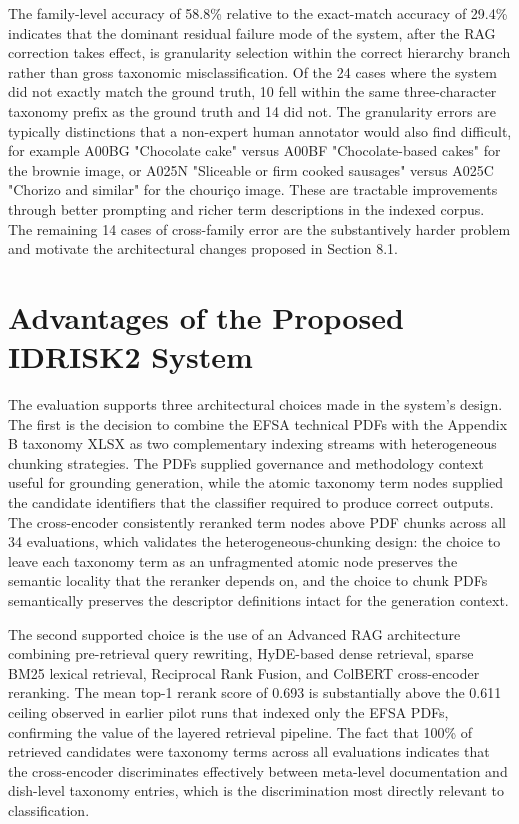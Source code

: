 The family-level accuracy of 58.8\% relative to the exact-match accuracy of 29.4\% indicates that the dominant residual failure mode of the system, after the RAG correction takes effect, is granularity selection within the correct hierarchy branch rather than gross taxonomic misclassification. Of the 24 cases where the system did not exactly match the ground truth, 10 fell within the same three-character taxonomy prefix as the ground truth and 14 did not. The granularity errors are typically distinctions that a non-expert human annotator would also find difficult, for example A00BG "Chocolate cake" versus A00BF "Chocolate-based cakes" for the brownie image, or A025N "Sliceable or firm cooked sausages" versus A025C "Chorizo and similar" for the chouriço image. These are tractable improvements through better prompting and richer term descriptions in the indexed corpus. The remaining 14 cases of cross-family error are the substantively harder problem and motivate the architectural changes proposed in Section 8.1.

\hypertarget{advantages-of-the-proposed-idrisk2-system}{%
\section{Advantages of the Proposed IDRISK2 System}\label{advantages-of-the-proposed-idrisk2-system}}

The evaluation supports three architectural choices made in the system's design. The first is the decision to combine the EFSA technical PDFs with the Appendix B taxonomy XLSX as two complementary indexing streams with heterogeneous chunking strategies. The PDFs supplied governance and methodology context useful for grounding generation, while the atomic taxonomy term nodes supplied the candidate identifiers that the classifier required to produce correct outputs. The cross-encoder consistently reranked term nodes above PDF chunks across all 34 evaluations, which validates the heterogeneous-chunking design: the choice to leave each taxonomy term as an unfragmented atomic node preserves the semantic locality that the reranker depends on, and the choice to chunk PDFs semantically preserves the descriptor definitions intact for the generation context.

The second supported choice is the use of an Advanced RAG architecture combining pre-retrieval query rewriting, HyDE-based dense retrieval, sparse BM25 lexical retrieval, Reciprocal Rank Fusion, and ColBERT cross-encoder reranking. The mean top-1 rerank score of 0.693 is substantially above the 0.611 ceiling observed in earlier pilot runs that indexed only the EFSA PDFs, confirming the value of the layered retrieval pipeline. The fact that 100\% of retrieved candidates were taxonomy terms across all evaluations indicates that the cross-encoder discriminates effectively between meta-level documentation and dish-level taxonomy entries, which is the discrimination most directly relevant to classification.

